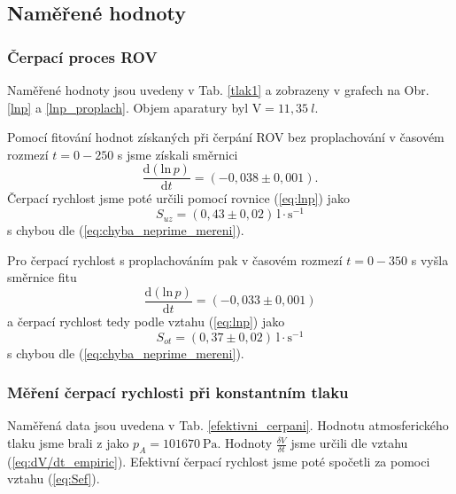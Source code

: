 \documentclass[english]{article}
\newcommand{\unit}[1]{\mathrm{#1}}
\newcommand{\dd}{\mathrm{d}}
\newcommand{\dln}{\mathrm{ln}}
\begin{document}
\subsection{Naměřené hodnoty}
	
	\subsubsection{Čerpací proces ROV}
	
	Naměřené hodnoty jsou uvedeny v Tab. \ref{tlak1} a zobrazeny v grafech na Obr. \ref{lnp} a \ref{lnp_proplach}.
	Objem aparatury byl $ \mathrm{V} = 11,35~l$. 
	
	Pomocí fitování hodnot získaných při čerpání ROV bez proplachování v časovém rozmezí $ t = 0-250 $ s jsme získali směrnici
	\begin{equation}
	\frac{\dd(\dln \,p)}{\dd t} = (-0,038\pm0,001).
	\end{equation} 
	Čerpací rychlost jsme poté určili pomocí rovnice (\ref{eq:lnp}) jako
	\begin{equation}
	S_{uz} = (0,43\pm0,02) \, \mathrm{l\cdot s^{-1}}
	\end{equation} 
	s chybou dle (\ref{eq:chyba_neprime_mereni}).
	
	
	Pro čerpací rychlost s proplachováním pak v časovém rozmezí $ t = 0-350 $ s vyšla směrnice fitu 
	\begin{equation}
	\frac{\dd(\dln \,p)}{\dd t} = (-0,033\pm0,001) 
	\end{equation} 
	a čerpací rychlost tedy podle vztahu (\ref{eq:lnp}) jako
	\begin{equation}
	S_{ot} = (0,37\pm0,02)~\mathrm{l\cdot s^{-1}}
	\end{equation} 
	s chybou dle (\ref{eq:chyba_neprime_mereni}).
	
	\subsubsection{Měření čerpací rychlosti při konstantním tlaku}
	
	Naměřená data jsou uvedena v Tab. \ref{efektivni_cerpani}. Hodnotu atmosferického tlaku jsme brali z \cite{bib:tlak} jako $p_A = 101670~\unit{Pa}$. Hodnoty $ \frac{\delta V}{\delta t} $ jsme určili dle vztahu (\ref{eq:dV/dt_empiric}). Efektivní čerpací rychlost jsme poté spočetli za pomoci vztahu (\ref{eq:Sef}).
	
\end{document}
